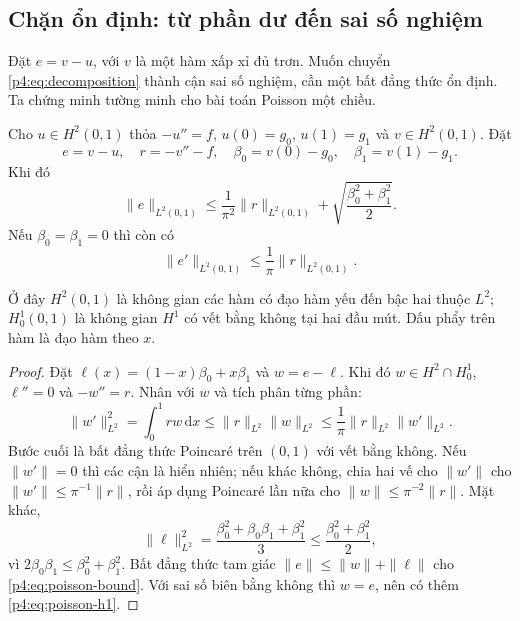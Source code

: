 \subsection{Chặn ổn định: từ phần dư đến sai số nghiệm}

Đặt $e=v-u$, với $v$ là một hàm xấp xỉ đủ trơn. Muốn chuyển
\eqref{p4:eq:decomposition} thành cận sai số nghiệm, cần một bất đẳng
thức ổn định. Ta chứng minh tường minh cho bài toán Poisson một chiều.

\begin{proposition}
Cho $u\in H^2(0,1)$ thỏa $-u''=f$, $u(0)=g_0$, $u(1)=g_1$ và
$v\in H^2(0,1)$. Đặt
\[
 e=v-u,\quad r=-v''-f,\quad
 \beta_0=v(0)-g_0,\quad\beta_1=v(1)-g_1.
\]
Khi đó
\begin{equation}
 \|e\|_{L^2(0,1)}
 \leq\frac{1}{\pi^2}\|r\|_{L^2(0,1)}
      +\sqrt{\frac{\beta_0^2+\beta_1^2}{2}}.
 \label{p4:eq:poisson-bound}
\end{equation}
Nếu $\beta_0=\beta_1=0$ thì còn có
\begin{equation}
 \|e'\|_{L^2(0,1)}\leq\frac{1}{\pi}\|r\|_{L^2(0,1)}.
 \label{p4:eq:poisson-h1}
\end{equation}
\end{proposition}
Ở đây $H^2(0,1)$ là không gian các hàm có đạo hàm yếu đến bậc hai
thuộc $L^2$; $H^1_0(0,1)$ là không gian $H^1$ có vết bằng không tại
hai đầu mút. Dấu phẩy trên hàm là đạo hàm theo $x$.

\begin{proof}
Đặt $\ell(x)=(1-x)\beta_0+x\beta_1$ và $w=e-\ell$.
Khi đó $w\in H^2\cap H^1_0$, $\ell''=0$ và $-w''=r$.
Nhân với $w$ và tích phân từng phần:
\[
 \|w'\|_{L^2}^2
 =\int_0^1rw\,\mathrm{d}x
 \leq\|r\|_{L^2}\|w\|_{L^2}
 \leq\frac{1}{\pi}\|r\|_{L^2}\|w'\|_{L^2}.
\]
Bước cuối là bất đẳng thức Poincaré trên $(0,1)$ với vết bằng không.
Nếu $\|w'\|=0$ thì các cận là hiển nhiên; nếu khác không, chia hai vế
cho $\|w'\|$ cho $\|w'\|\leq\pi^{-1}\|r\|$, rồi áp dụng Poincaré
lần nữa cho $\|w\|\leq\pi^{-2}\|r\|$. Mặt khác,
\[
 \|\ell\|_{L^2}^2
 =\frac{\beta_0^2+\beta_0\beta_1+\beta_1^2}{3}
 \leq\frac{\beta_0^2+\beta_1^2}{2},
\]
vì $2\beta_0\beta_1\leq\beta_0^2+\beta_1^2$.
Bất đẳng thức tam giác $\|e\|\leq\|w\|+\|\ell\|$ cho
\eqref{p4:eq:poisson-bound}. Với sai số biên bằng không thì $w=e$,
nên có thêm \eqref{p4:eq:poisson-h1}.
\end{proof}

